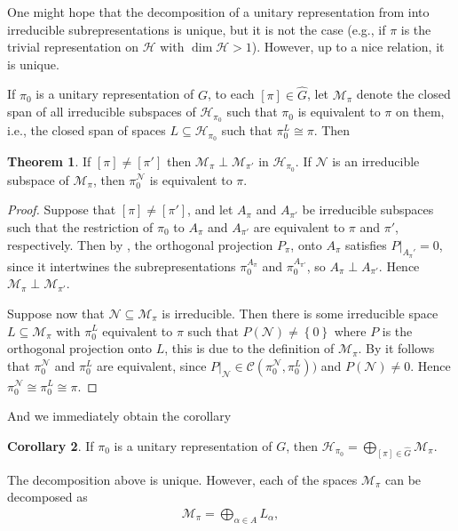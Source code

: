 \documentclass[10pt,twoside,openany,final]{memoir}
\theoremstyle{definition}
\newtheorem{theorem}{Theorem}[chapter]
\newtheorem{corollary}[theorem]{Corollary}
\theoremstyle{Break}
\newcommand{\G}{\widehat{G}}
\renewcommand{\H}{\mathcal{H}}
\begin{document}
One might hope that the decomposition of a unitary representation from  into irreducible subrepresentations is unique, but it is not the case (e.g., if $\pi$ is the trivial representation on $\H$ with $\dim \H >1$). However, up to a nice relation, it is unique.

If $\pi_0$ is a unitary representation of $G$, to each $[\pi]\in \G$, let $\mathcal{M}_\pi$ denote the closed span of all irreducible subspaces of $\H_{\pi_0}$ such that $\pi_0$ is equivalent to $\pi$ on them, i.e., the closed span of spaces $L \subseteq \H_{\pi_0}$ such that $\pi_0^{L}\cong \pi$. Then
\begin{theorem}
	If $[\pi] \neq [\pi']$ then $\mathcal{M}_\pi \perp \mathcal{M}_{\pi'}$ in $\H_{\pi_0}$. If $\mathcal{N}$ is an irreducible subspace of $\mathcal{M}_\pi$, then $\pi_0^{\mathcal{N}}$ is equivalent to $\pi$.
	\label{5.3}
\end{theorem}
\begin{proof}
	Suppose that $[\pi]\neq [\pi']$, and let $A_\pi$ and $A_{\pi'}$ be irreducible subspaces such that the restriction of $\pi_0$ to $A_\pi$ and $A_{\pi'}$ are equivalent to $\pi$ and $\pi'$, respectively. Then by , the orthogonal projection $P_\pi$, onto $A_\pi$ satisfies $P|_{A_\pi'} =0$, since it intertwines the subrepresentations $\pi_0^{A_\pi}$ and $\pi_0^{A_{\pi'}}$, so $A_\pi \perp A_{\pi'}$. Hence $\mathcal{M}_\pi\perp\mathcal{M}_{\pi'}$.

	Suppose now that $\mathcal{N}\subseteq \mathcal{M}_\pi$ is irreducible. Then there is some irreducible space $L \subseteq \mathcal{M}_{\pi}$ with $\pi_0^{L}$ equivalent to $\pi$ such that $P(\mathcal{N})\neq \left\{ 0 \right\}$ where $P$ is the orthogonal projection onto $L$, this is due to the definition of $\mathcal{M}_\pi$. By  it follows that $\pi_0^{\mathcal{N}}$ and $\pi_0^{L}$ are equivalent, since $P|_{\mathcal{N}} \in \mathcal{C}(\pi_0^{\mathcal{N}},\pi_{0}^{L}))$ and $P(\mathcal{N})\neq 0$. Hence $\pi_0^{\mathcal{N}} \cong \pi_0^L \cong \pi$.
\end{proof}
And we immediately obtain the corollary
\begin{corollary}
If $\pi_0$ is a unitary representation of $G$, then $\H_{\pi_0} = \bigoplus_{[\pi]\in \G} \mathcal{M}_\pi$.	
\end{corollary}
The decomposition above is unique. However, each of the spaces $\mathcal{M}_\pi$ can be decomposed as
\begin{align}
	\mathcal{M}_\pi = \bigoplus_{\alpha \in A} L_\alpha,
	\label{multeq}
\end{align}
\end{document}
